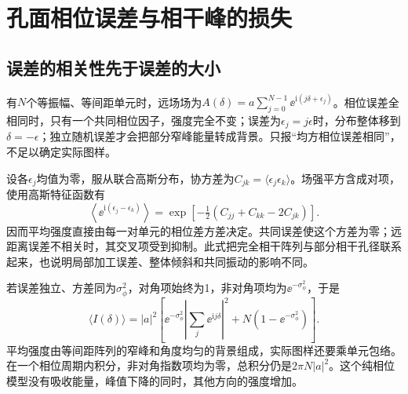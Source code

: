 \section{孔面相位误差与相干峰的损失}
\subsection{误差的相关性先于误差的大小}
有$N$个等振幅、等间距单元时，远场场为$A(\delta)=a\sum_{j=0}^{N-1}\ee^{\mathrm i(j\delta+\epsilon_j)}$。相位误差全相同时，只有一个共同相位因子，强度完全不变；误差为$\epsilon_j=j\epsilon$时，分布整体移到$\delta=-\epsilon$；独立随机误差才会把部分窄峰能量转成背景。只报“均方相位误差相同”，不足以确定实际图样。

设各$\epsilon_j$均值为零，服从联合高斯分布，协方差为$C_{jk}=\langle\epsilon_j\epsilon_k\rangle$。场强平方含成对项，使用高斯特征函数有
\[
 \left\langle\ee^{\mathrm i(\epsilon_j-\epsilon_k)}\right\rangle
 =\exp[-\tfrac12(C_{jj}+C_{kk}-2C_{jk})].
\]
因而平均强度直接由每一对单元的相位差方差决定。共同误差使这个方差为零；远距离误差不相关时，其交叉项受到抑制。此式把完全相干阵列与部分相干孔径联系起来，也说明局部加工误差、整体倾斜和共同振动的影响不同。

若误差独立、方差同为$\sigma_\phi^2$，对角项始终为1，非对角项均为$\ee^{-\sigma_\phi^2}$，于是
\[
 \langle I(\delta)\rangle=|a|^2\left[
 \ee^{-\sigma_\phi^2}\left|\sum_j\ee^{\mathrm ij\delta}\right|^2
 +N(1-\ee^{-\sigma_\phi^2})\right].
\]
平均强度由等间距阵列的窄峰和角度均匀的背景组成，实际图样还要乘单元包络。在一个相位周期内积分，非对角指数项均为零，总积分仍是$2\pi N|a|^2$。这个纯相位模型没有吸收能量，峰值下降的同时，其他方向的强度增加。

